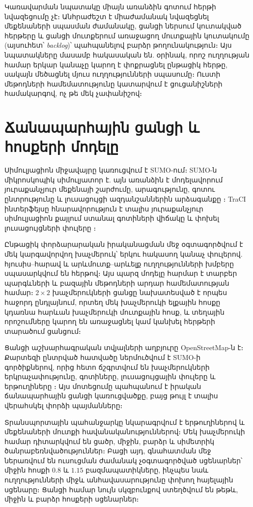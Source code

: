 \documentclass[12pt,a4paper]{extreport}
\begin{document}
Կառավարման նպատակը միայն առանձին գոտում հերթի նվազեցումը չէ։ Անհրաժեշտ է միաժամանակ նվազեցնել մեքենաների սպասման ժամանակը, ցանցի ներսում կուտակված հերթերը և ցանցի մուտքերում առաջացող մուտքային կուտակումը (այսուհետ՝ \textit{backlog})՝ պահպանելով բարձր թողունակություն։ Այս նպատակները մասամբ հակասական են. օրինակ, որոշ ուղղության համար երկար կանաչը կարող է փոքրացնել ընթացիկ հերթը, սակայն մեծացնել մյուս ուղղությունների սպասումը։ Ուստի մեթոդների համեմատությունը կատարվում է ցուցանիշների համակարգով, ոչ թե մեկ չափանիշով։

\section{Ճանապարհային ցանցի և հոսքերի մոդելը}

Սիմուլյացիոն միջավայրը կառուցվում է SUMO-ում։ SUMO-ն միկրոսկոպիկ սիմուլյատոր է. այն առանձին է մոդելավորում յուրաքանչյուր մեքենայի շարժումը, արագությունը, գոտու ընտրությունը և լուսացույցի ազդանշաններին արձագանքը \cite{lopez2018}։ TraCI ինտերֆեյսը հնարավորություն է տալիս յուրաքանչյուր սիմուլյացիոն քայլում ստանալ գոտիների վիճակը և փոխել լուսացույցների փուլերը \cite{traciDocs}։

Ընթացիկ փորձարարական իրականացման մեջ օգտագործվում է մեկ կարգավորվող խաչմերուկ՝ երկու հակասող կանաչ փուլերով. հյուսիս--հարավ և արևմուտք--արևելք ուղղությունների խմբերը սպասարկվում են հերթով։ Այս պարզ մոդելը հարմար է տարբեր պարգևների և բազային մեթոդների արդար համեմատության համար։ $2\times2$ խաչմերուկների ցանցը նախատեսված է որպես հաջորդ ընդլայնում, որտեղ մեկ խաչմերուկի ելքային հոսքը կդառնա հարևան խաչմերուկի մուտքային հոսք, և տեղային որոշումները կարող են առաջացնել կամ կանխել հերթերի տարածում ցանցում։

Ցանցի աշխարհագրական տվյալների աղբյուրը OpenStreetMap-ն է։ Քարտեզի ընտրված հատվածը ներմուծվում է SUMO-ի գործիքներով, որից հետո ճշգրտվում են խաչմերուկների երկրաչափությունը, գոտիները, լուսացույցային փուլերը և երթուղիները \cite{sumoDocs,openstreetmap}։ Այս մոտեցումը պահպանում է իրական ճանապարհային ցանցի կառուցվածքը, բայց թույլ է տալիս վերահսկել փորձի պայմանները։

Տրանսպորտային պահանջարկը նկարագրվում է երթուղիներով և մեքենաների մուտքի հավանականություններով։ Մեկ խաչմերուկի համար դիտարկվում են ցածր, միջին, բարձր և սիմետրիկ ծանրաբեռնվածություններ։ Բացի այդ, գնահատման մեջ ներառվում են ուսուցման ժամանակ չօգտագործված սցենարներ՝ միջին հոսքի $0.8$ և $1.15$ բազմապատիկները, ինչպես նաև ուղղությունների միջև անհավասարությունը փոխող հայելային սցենարը։ Ցանցի համար նույն սկզբունքով ստեղծվում են թեթև, միջին և բարձր հոսքերի սցենարներ։
\end{document}
